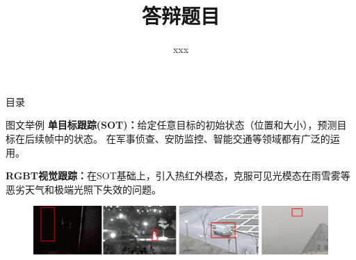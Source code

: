 \documentclass[aspectratio=169]{ahu-slide}
\title{答辩题目}
\author{xxx}
\begin{document}
\maketitle

\begin{frame}{目录}
    \tableofcontents
\end{frame}


\begin{frame}{图文举例}
    \textbf{单目标跟踪(SOT)：}给定任意目标的初始状态（位置和大小），预测目标在后续帧中的状态。
    在军事侦查、安防监控、智能交通等领域都有广泛的运用。

    \textbf{RGBT视觉跟踪：}在SOT基础上，引入热红外模态，克服可见光模态在雨雪雾等恶劣天气和极端光照下失效的问题。\par

    \begin{figure}
        \centering
        \includegraphics[width=1\linewidth]{paper_figs/成像相关的挑战.png}
    \end{figure}
\end{frame}
\end{document}
